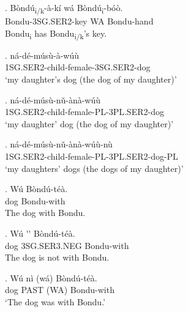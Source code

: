\documentclass{assets/fieldnotes}
\begin{document}
\exg. B\`{o}nd\'{u}\textsubscript{i/k}-\`{a}-k\'{i} w\'{a} B\`{o}nd\'{u}\textsubscript{i}-b\'{o}\`{o}. \\
Bondu-3SG.SER2-key WA Bondu-hand \\ 
Bondu\textsubscript{i} has Bondu\textsubscript{i/k}'s key. 

\exg. n\'{a}-d\'{e}-m\'{u}s\`{u}-\`{a}-w\'{u}\`{u} \\
1SG.SER2-child-female-3SG.SER2-dog \\
`my daughter's dog (the dog of my daughter)' 

\exg. n\'{a}-d\'{e}-m\'{u}s\`{u}-n\v{u}-\`{a}n\`{a}-w\'{u}\`{u} \\
1SG.SER2-child-female-PL-3PL.SER2-dog \\
`my daughter' dog (the dog of my daughter)' 

\exg. n\'{a}-d\'{e}-m\'{u}s\`{u}-n\v{u}-\`{a}n\`{a}-w\'{u}\`{u}-n\`{u} \\
1SG.SER2-child-female-PL-3PL.SER2-dog-PL \\
`my daughters' dogs (the dogs of my daughter)'


 \newline


\exg. W\'{u} B\`{o}nd\'{u}-t\'{e}\`{a}. \\
dog Bondu-with \\
The dog with Bondu. 

\exg. W\'{u} \'{}\'{} B\`{o}nd\'{u}-t\'{e}\`{a}. \\
dog 3SG.SER3.NEG Bondu-with \\
The dog is not with Bondu. 

\exg. W\'{u} n\`{i} (w\'{a}) B\`{o}nd\'{u}-t\'{e}\`{a}. \\
dog PAST (WA) Bondu-with \\
`The dog was with Bondu.' 
\end{document}
